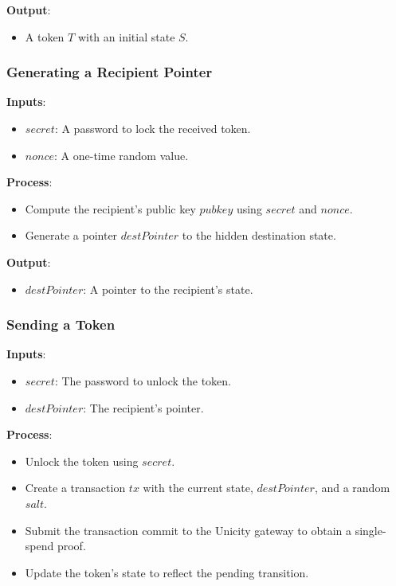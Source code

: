 \noindent\textbf{Output}:
\begin{itemize}
  \item A token \( T \) with an initial state \( S \).
\end{itemize}


\subsubsection{Generating a Recipient Pointer}

\noindent\textbf{Inputs}:
  \begin{itemize}
    \item \( secret \): A password to lock the received token.
    \item \( nonce \): A one-time random value.
  \end{itemize}

\noindent\textbf{Process}:
  \begin{itemize}
    \item Compute the recipient's public key \( pubkey \) using \( secret \) and \( nonce \).
    \item Generate a pointer \( destPointer \) to the hidden destination state.
  \end{itemize}

\noindent\textbf{Output}:
  \begin{itemize}
    \item \( destPointer \): A pointer to the recipient's state.
  \end{itemize}


\subsubsection{Sending a Token}

\noindent\textbf{Inputs}:
  \begin{itemize}
    \item \( secret \): The password to unlock the token.
    \item \( destPointer \): The recipient's pointer.
  \end{itemize}

\noindent\textbf{Process}:
  \begin{itemize}
    \item Unlock the token using \( secret \).
    \item Create a transaction \( tx \) with the current state, \( destPointer \), and a random \( salt \).
    \item Submit the transaction commit to the Unicity gateway to obtain a single-spend proof.
    \item Update the token's state to reflect the pending transition.
  \end{itemize}

